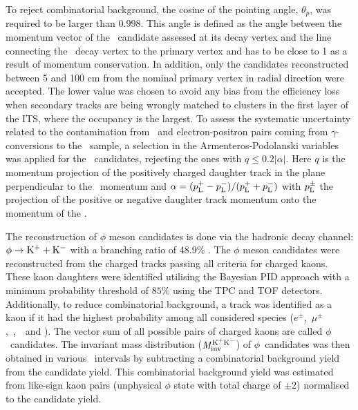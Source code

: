 To reject combinatorial background, the cosine of the pointing angle, $\theta_{p}$, was required to be larger than 0.998. This angle is defined as the angle between the momentum vector of the \vo~candidate assessed at its decay vertex and the line connecting the \vo~decay vertex to the primary vertex and has to be close to 1 as a result of momentum conservation. In addition, only the candidates reconstructed between 5 and 100 cm from the nominal primary vertex in radial direction were accepted. The lower value was chosen to avoid any bias from the efficiency loss when secondary tracks are being wrongly matched to clusters in the first layer of the ITS, where the occupancy is the largest. To assess the systematic uncertainty related to the contamination from \lambdas~and electron-positron pairs coming from $\gamma$-conversions to the \Ks~sample, a selection in the Armenteros-Podolanski variables \cite{doi:10.1080/14786440108520416} was applied for the \Ks~candidates, rejecting the ones with $q\le 0.2|\alpha|$. Here $q$ is the momentum projection of the positively charged daughter track in the plane perpendicular to the \vo~momentum and $\alpha = (p_{\rm{L}}^{+} - p_{\rm{L}}^{-})/(p_{\rm{L}}^{+} + p_{\rm{L}}^{-})$ with $p_{\rm{L}}^{\pm}$ the projection of the positive or negative daughter track momentum onto the momentum of the \vo. 

The reconstruction of $\phi$ meson candidates is done via the hadronic decay channel: $\phi \rightarrow {\rm K}^{+} + {\rm K}^{-}$ with a branching ratio of 48.9\% \cite{PhysRevD.98.030001}. The $\phi$ meson candidates were reconstructed from the charged tracks passing all criteria for charged kaons. These kaon daughters were identified utilising the Bayesian PID approach \cite{Adam:2016acv} with a minimum probability threshold of $85\%$ using the TPC and TOF detectors. Additionally, to reduce combinatorial background, a track was identified as a kaon if it had the highest probability among all considered species ($e^{\pm}$,~$\mu^{\pm}$,~\pion,~\kaon~and \proton). The vector sum of all possible pairs of charged kaons are called $\phi$~candidates. The invariant mass distribution (${\it M}_{\rm inv}^{\rm K^{+}K^{-}}$) of $\phi$~candidates was then obtained in various \pT~intervals by subtracting a combinatorial background yield from the candidate yield. This combinatorial background yield was estimated from like-sign kaon pairs (unphysical $\phi$ state with total charge of $\pm2$) normalised to the candidate yield. 
